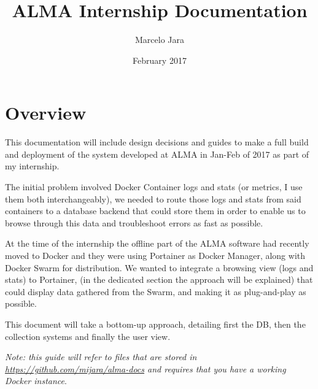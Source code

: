 \documentclass{report}
\title{ALMA Internship Documentation}
\author{Marcelo Jara}
\date{February 2017}
\begin{document}
\maketitle

\chapter{Overview}

This documentation will include design decisions and 
guides to make a full build and deployment of the system
developed at ALMA in Jan-Feb of 2017 
as part of my internship.

The initial problem involved Docker Container logs and stats 
(or metrics, I use them both interchangeably), 
we needed to route those logs and stats
from said containers to a database backend 
that could store them in order to enable us to
browse through this data and troubleshoot errors as fast as possible.

At the time of the internship the offline part of the ALMA software
had recently moved to Docker and they were using Portainer as Docker Manager, along with Docker Swarm for distribution. 
We wanted to integrate a browsing view (logs and stats) to Portainer, 
(in the dedicated section the approach will be explained)
that could display data gathered from the Swarm, 
and making it as plug-and-play as possible.

This document will take a bottom-up approach, 
detailing first the DB, then the collection systems and 
finally the user view.

\textit{Note: this guide will refer to files that are stored 
in \url{https://github.com/mijara/alma-docs} and requires 
that you have a working Docker instance}.

\tableofcontents











\end{document}
